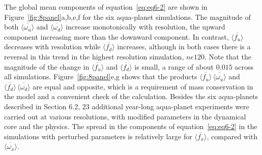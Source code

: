 The global mean components of equation~\ref{eq:eq6-2} are shown in Figure~\ref{fig:8panel}a,b,e,f for the six aqua-planet simulations. The magnitude of both $\overline{\langle \omega_{u} \rangle}$ and $\overline{\langle \omega_{d} \rangle}$ increase monotonically with resolution, the upward component increasing more than the downward component. In contrast, $\overline{\langle f_{u} \rangle}$ decreases with resolution while $\overline{\langle f_{d} \rangle}$ increases, although in both cases there is a reversal in this trend in the highest resolution simulation, $ne120$. Note that the magnitude of the change in $\overline{\langle f_{u} \rangle}$ and $\overline{\langle f_{d} \rangle}$ is small, a range of about $0.015$ across all simulations. Figure~\ref{fig:8panel}e,g shows that the products  $\overline{\langle f_{u} \rangle} \, \overline{\langle \omega_{u} \rangle}$ and $\overline{\langle f_{d} \rangle} \, \overline{\langle \omega_{d} \rangle}$ are equal and opposite, which is a requirement of mass conservation in the model and a convenient check of the calculation. Besides the six aqua-planets described in Section 6.2, 23 additional year-long aqua-planet experiments were carried out at various resolutions, with modified parameters in the dynamical core and the physics. The spread in the components of equation~\ref{eq:eq6-2} in the simulations with perturbed parameters is relatively large for $\overline{\langle f_{x} \rangle}$, compared with $\overline{\langle \omega_{x} \rangle}$.


